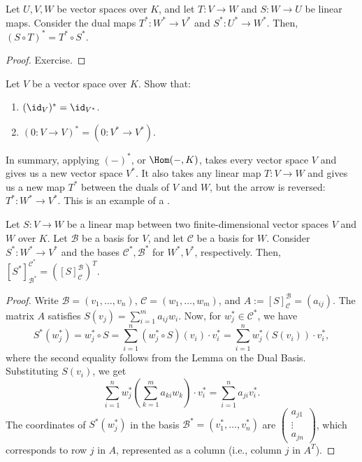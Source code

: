 \begin{proposition}
  Let $U, V, W$ be vector spaces over $K$, and let $T \colon V \to W$ and $S \colon W \to U$ be linear maps. Consider the dual maps $T^* \colon W^* \to V^*$ and $S^* \colon U^* \to W^*$. Then, $(S \circ T)^* = T^* \circ S^*$.
\end{proposition}

\begin{proof}
  Exercise.
\end{proof}

\begin{exercise}
  Let $V$ be a vector space over $K$. Show that:
  \begin{enumerate}
    \item $(\id_V)^* = \id_{V^*}$.
    \item $(0 \colon V \to V)^* = (0 \colon V^* \to V^*)$.
  \end{enumerate}
\end{exercise}

\begin{summary}
In summary, applying $(-)^*$, or $\Hom(-,K)$, takes every vector space $V$ and gives us a new vector space $V^*$. It also takes any linear map $T \colon V \to W$ and gives us a new map $T^*$ between the duals of $V$ and $W$, but the arrow is reversed: $T^* \colon W^* \to V^*$. This is an example of a .
\end{summary}

\begin{lemma}
  Let $S \colon V \to W$ be a linear map between two finite-di\-men\-sional vector spaces $V$ and $W$ over $K$. Let $\mathcal{B}$ be a basis for $V$, and let $\mathcal{C}$ be a basis for $W$. Consider $S^* \colon W^* \to V^*$ and the bases $\mathcal{C}^*, \mathcal{B}^*$ for $W^*, V^*$, respectively. Then, $[S^*]_{\mathcal{B}^*}^{\mathcal{C}^*} = ([S]_{\mathcal{C}}^{\mathcal{B}})^T$.
\end{lemma}

\begin{proof}
  Write $\mathcal{B} = (v_1, \dots, v_n)$, $\mathcal{C} = (w_1, \dots, w_m)$, and $A := [S]_{\mathcal{C}}^{\mathcal{B}} = (a_{ij})$. The matrix $A$ satisfies $S(v_j) = \sum_{i=1}^m a_{ij} w_i$. Now, for $w_j^* \in \mathcal{C}^*$, we have
  \[ S^*(w_j^*) = w_j^* \circ S = \sum_{i=1}^n (w_j^* \circ S)(v_i) \cdot v_i^* = \sum_{i=1}^n w_j^*(S(v_i)) \cdot v_i^*, \]
  where the second equality follows from the Lemma on the Dual Basis. Substituting $S(v_i)$, we get
  \[ \sum_{i=1}^n w_j^*\left(\sum_{k=1}^m a_{ki} w_k\right) \cdot v_i^* = \sum_{i=1}^n a_{ji} v_i^*. \]
  The coordinates of $S^*(w_j^*)$ in the basis $\mathcal{B}^* = (v_1^*, \dots, v_n^*)$ are $\left(\begin{smallmatrix} a_{j1} \\ \vdots \\ a_{jn} \end{smallmatrix}\right)$, which corresponds to row $j$ in $A$, represented as a column (i.e., column $j$ in $A^T$). 
\end{proof}


